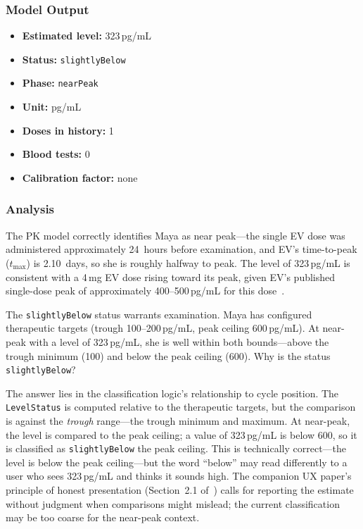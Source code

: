 \documentclass[11pt,a4paper]{article}
\newcommand{\code}[1]{\texttt{\small #1}}
\begin{document}
\subsubsection{Model Output}

\begin{itemize}[nosep,leftmargin=1.4em]
\item \textbf{Estimated level:} 323\,pg/mL
\item \textbf{Status:} \code{slightlyBelow}
\item \textbf{Phase:} \code{nearPeak}
\item \textbf{Unit:} pg/mL
\item \textbf{Doses in history:} 1
\item \textbf{Blood tests:} 0
\item \textbf{Calibration factor:} none
\end{itemize}

\subsubsection{Analysis}

The PK model correctly identifies Maya as near peak---the single EV dose was
administered approximately 24~hours before examination, and EV's
time-to-peak ($t_{\max}$) is 2.10~days, so she is roughly halfway to peak.
The level of 323\,pg/mL is consistent with a 4\,mg EV dose rising toward its
peak, given EV's published single-dose peak of approximately
400--500\,pg/mL for this dose~\cite{xtpk}.

The \code{slightlyBelow} status warrants examination. Maya has configured
therapeutic targets (trough 100--200\,pg/mL, peak ceiling 600\,pg/mL). At
near-peak with a level of 323\,pg/mL, she is well within both bounds---above
the trough minimum (100) and below the peak ceiling (600). Why is the status
\code{slightlyBelow}?

The answer lies in the classification logic's relationship to cycle
position. The \code{LevelStatus} is computed relative to the therapeutic
targets, but the comparison is against the \emph{trough} range---the
trough minimum and maximum. At near-peak, the level is compared to the peak
ceiling; a value of 323\,pg/mL is below 600, so it is classified as
\code{slightlyBelow} the peak ceiling. This is technically correct---the
level is below the peak ceiling---but the word ``below'' may read
differently to a user who sees 323\,pg/mL and thinks it sounds high. The
companion UX paper's principle of honest presentation
(Section~2.1 of~\cite{xtux}) calls for reporting the estimate without
judgment when comparisons might mislead; the current classification may be
too coarse for the near-peak context.
\end{document}
